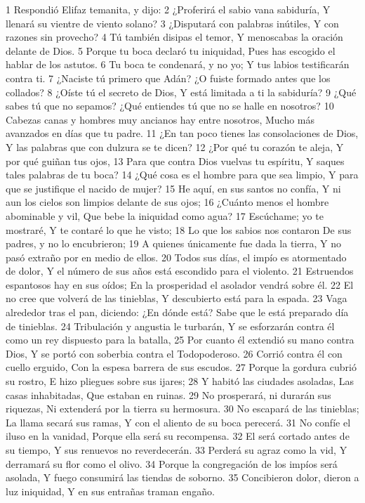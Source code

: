 1 Respondió Elifaz temanita, y dijo:
2 ¿Proferirá el sabio vana sabiduría,
Y llenará su vientre de viento solano?
3 ¿Disputará con palabras inútiles,
Y con razones sin provecho?
4 Tú también disipas el temor,
Y menoscabas la oración delante de Dios.
5 Porque tu boca declaró tu iniquidad,
Pues has escogido el hablar de los astutos.
6 Tu boca te condenará, y no yo;
Y tus labios testificarán contra ti.
7 ¿Naciste tú primero que Adán?
¿O fuiste formado antes que los collados?
8 ¿Oíste tú el secreto de Dios,
Y está limitada a ti la sabiduría?
9 ¿Qué sabes tú que no sepamos?
¿Qué entiendes tú que no se halle en nosotros? 
10 Cabezas canas y hombres muy ancianos hay entre nosotros,
Mucho más avanzados en días que tu padre.
11 ¿En tan poco tienes las consolaciones de Dios,
Y las palabras que con dulzura se te dicen?
12 ¿Por qué tu corazón te aleja,
Y por qué guiñan tus ojos,
13 Para que contra Dios vuelvas tu espíritu,
Y saques tales palabras de tu boca?
14 ¿Qué cosa es el hombre para que sea limpio,
Y para que se justifique el nacido de mujer?
15 He aquí, en sus santos no confía,
Y ni aun los cielos son limpios delante de sus ojos;
16 ¿Cuánto menos el hombre abominable y vil,
Que bebe la iniquidad como agua?
17 Escúchame; yo te mostraré,
Y te contaré lo que he visto;
18 Lo que los sabios nos contaron
De sus padres, y no lo encubrieron;
19 A quienes únicamente fue dada la tierra,
Y no pasó extraño por en medio de ellos.
20 Todos sus días, el impío es atormentado de dolor,
Y el número de sus años está escondido para el violento. 
21 Estruendos espantosos hay en sus oídos;
En la prosperidad el asolador vendrá sobre él.
22 El no cree que volverá de las tinieblas,
Y descubierto está para la espada.
23 Vaga alrededor tras el pan, diciendo: ¿En dónde está?
Sabe que le está preparado día de tinieblas.
24 Tribulación y angustia le turbarán,
Y se esforzarán contra él como un rey dispuesto para la batalla,
25 Por cuanto él extendió su mano contra Dios,
Y se portó con soberbia contra el Todopoderoso.
26 Corrió contra él con cuello erguido, 
Con la espesa barrera de sus escudos.
27 Porque la gordura cubrió su rostro,
E hizo pliegues sobre sus ijares;
28 Y habitó las ciudades asoladas,
Las casas inhabitadas,
Que estaban en ruinas.
29 No prosperará, ni durarán sus riquezas,
Ni extenderá por la tierra su hermosura.
30 No escapará de las tinieblas;
La llama secará sus ramas,
Y con el aliento de su boca perecerá.
31 No confíe el iluso en la vanidad,
Porque ella será su recompensa.
32 El será cortado antes de su tiempo,
Y sus renuevos no reverdecerán.
33 Perderá su agraz como la vid,
Y derramará su flor como el olivo.
34 Porque la congregación de los impíos será asolada,
Y fuego consumirá las tiendas de soborno.
35 Concibieron dolor, dieron a luz iniquidad,
Y en sus entrañas traman engaño.

